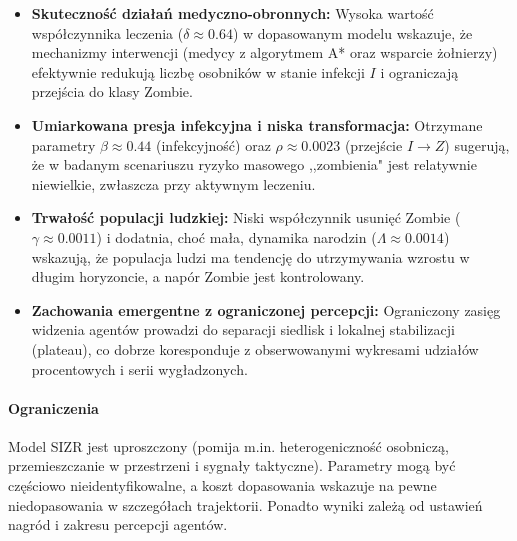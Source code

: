 \documentclass[12pt, a4paper]{article}
\begin{document}
\begin{itemize}
    \item \textbf{Skuteczność działań medyczno-obronnych:} Wysoka wartość
          współczynnika leczenia ($\delta\approx0.64$) w dopasowanym modelu wskazuje,
          że mechanizmy
          interwencji (medycy z algorytmem A* oraz wsparcie żołnierzy) efektywnie
          redukują liczbę osobników w stanie infekcji $I$ i ograniczają przejścia do
          klasy Zombie.

    \item \textbf{Umiarkowana presja infekcyjna i niska transformacja:}
          Otrzymane parametry $\beta\approx0.44$ (infekcyjność) oraz
          $\rho\approx0.0023$ (przejście $I\to Z$) sugerują, że w badanym scenariuszu
          ryzyko masowego ,,zombienia" jest relatywnie niewielkie, zwłaszcza przy
          aktywnym leczeniu.

    \item \textbf{Trwałość populacji ludzkiej:} Niski współczynnik usunięć
          Zombie ($\gamma\approx0.0011$) i dodatnia, choć mała, dynamika narodzin
          ($\Lambda\approx0.0014$) wskazują, że populacja ludzi ma tendencję do
          utrzymywania wzrostu w długim horyzoncie, a napór Zombie jest kontrolowany.

    \item \textbf{Zachowania emergentne z ograniczonej percepcji:} Ograniczony
          zasięg widzenia agentów prowadzi do separacji siedlisk i lokalnej
          stabilizacji (plateau), co dobrze koresponduje z obserwowanymi wykresami
          udziałów procentowych i serii wygładzonych.
\end{itemize}

\paragraph{Ograniczenia}
Model SIZR jest uproszczony (pomija m.in. heterogeniczność osobniczą,
przemieszczanie w przestrzeni i sygnały taktyczne). Parametry mogą być
częściowo nieidentyfikowalne, a koszt dopasowania wskazuje na pewne
niedopasowania w szczegółach trajektorii. Ponadto wyniki zależą od ustawień
nagród i zakresu percepcji agentów.
\end{document}
